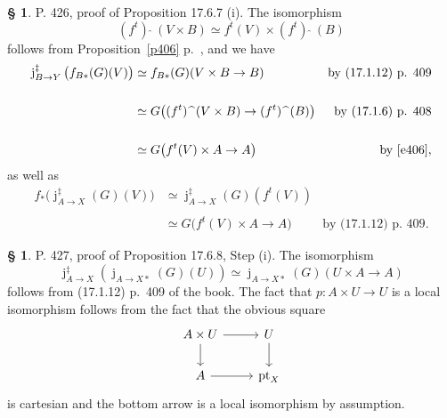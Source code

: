 \documentclass[12pt]{article}%
\theoremstyle{remark}
\theoremstyle{definition}
\newtheorem{s}[thm]{\S}%
\newcommand{\oo}{\operatorname}
\newcommand{\fthat}{(f^t)\ \widehat{}\ }
\begin{document}
%

\begin{s} 
P. 426, proof of Proposition 17.6.7 (i). The isomorphism 
\begin{equation}\label{e406}
\fthat(V\times B)\simeq f^t(V)\times\fthat(B)
\end{equation} 
follows from Proposition~\ref{p406} p.~\pageref{p406}, and we have 
\begin{align*} 
%
\oo j_{B\to Y}^\ddagger\big(f_{B*}(G)(V)\big)&\simeq f_{B*}(G)(V\times B\to B)&\text{by (17.1.12) p. 409}\\ \\ 
%
&\simeq G\big(\fthat(V\times B)\to\fthat(B)\big)&\text{by (17.1.6) p. 408}\\ \\ 
%
&\simeq G\big(f^t(V)\times A\to A\big)&\text{by \eqref{e406}}, 
% 
\end{align*} 
as well as 
\begin{align*} 
%
f_*\big(\oo j_{A\to X}^\ddagger(G)(V)\big)&\simeq\oo j_{A\to X}^\ddagger(G)(f^t(V))\\ \\ 
%
&\simeq G\big(f^t(V)\times A\to A\big)&\text{by (17.1.12) p. 409}. 
% 
\end{align*}  
\end{s} 

% 

\begin{s}\label{1768}
P. 427, proof of Proposition 17.6.8, Step (i). The isomorphism 
$$
\oo j_{A\to X}^\ddagger(\oo j_{A\to X*}(G)(U))\simeq\oo j_{A\to X*}(G)(U\times A\to A)
$$ 
follows from (17.1.12) p.~409 of the book. The fact that $p:A\times U\to U$ is a local isomorphism follows from the fact that the obvious square 
$$
\begin{tikzcd} 
A\times U\ar{r}\ar{d}&U\ar{d}\\ 
A\ar{r}&\oo{pt}_X
\end{tikzcd}
$$ 
is cartesian and the bottom arrow is a local isomorphism by assumption. 
\end{s} 

%
\end{document}
